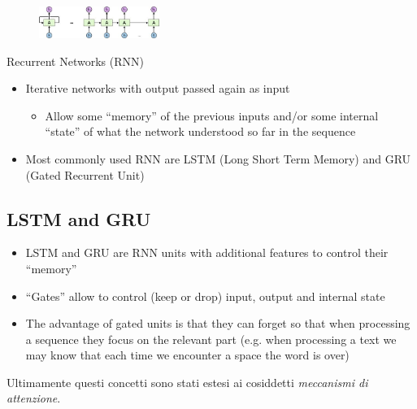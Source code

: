\begin{figure}
	\includegraphics[width=0.35\textwidth]{figure_ml/t_invariance.png}
\end{figure}

Recurrent Networks (RNN)
\begin{itemize}
	\item Iterative networks with output passed again as input
	\begin{itemize}
		\item Allow some “memory” of the previous inputs and/or some internal “state” of what the network understood so far in the sequence
	\end{itemize}
	\item Most commonly used RNN are LSTM (Long Short Term Memory) and GRU (Gated Recurrent Unit)
\end{itemize}

\subsection{LSTM and GRU}
\begin{itemize}
	\item LSTM and GRU are RNN units with additional features to control their “memory”
	\item “Gates” allow to control (keep or drop) input, output and internal state
	\item The advantage of gated units is that they can forget so
	that when processing a sequence they focus on the
	relevant part (e.g. when processing a text we may know that each time we encounter a space the word is over)
\end{itemize}

Ultimamente questi concetti sono stati estesi ai cosiddetti \textit{meccanismi di attenzione}.



